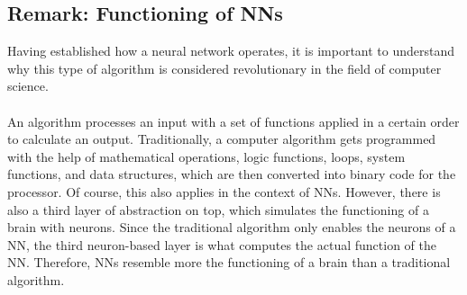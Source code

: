 \subsection{Remark: Functioning of NNs}\label{subsec:remark-about-the-funtioning-of-nns}
Having established how a neural network operates, it is important to understand why this type of algorithm is considered revolutionary in the field of computer science.
\\ \\
An algorithm processes an input with a set of functions applied in a certain order to calculate an output.
Traditionally, a computer algorithm gets programmed with the help of mathematical operations, logic functions, loops, system functions, and data structures, which are then converted into binary code for the processor.
Of course, this also applies in the context of NNs.
However, there is also a third layer of abstraction on top, which simulates the functioning of a brain with neurons.
Since the traditional algorithm only enables the neurons of a NN, the third neuron-based layer is what computes the actual function of the NN. Therefore, NNs resemble more the functioning of a brain than a traditional algorithm.
\\

